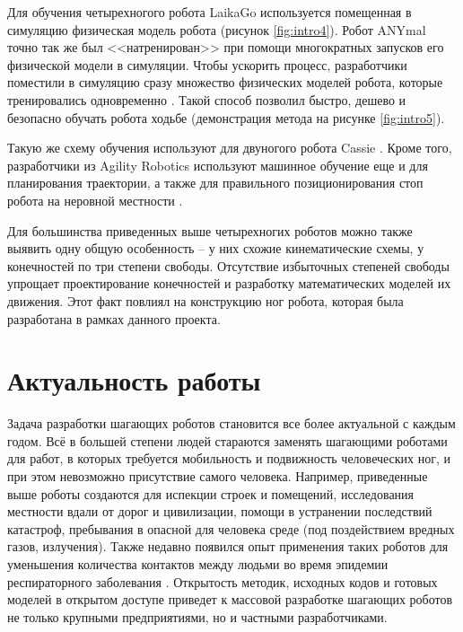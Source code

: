 Для обучения четырехногого робота LaikaGo используется помещенная в симуляцию физическая модель робота \cite{LaikaGo2019} (рисунок \ref{fig:intro4}). Робот ANYmal точно так же был <<натренирован>> при помощи многократных запусков его физической модели в симуляции. Чтобы ускорить процесс, разработчики поместили в симуляцию сразу множество физических моделей робота, которые тренировались одновременно \cite{RoboSysLab2019}. Такой способ позволил быстро, дешево и безопасно обучать робота ходьбе (демонстрация метода на рисунке \ref{fig:intro5}). 

Такую же схему обучения используют для двуногого робота Cassie \cite{AgilityRobo2018}. Кроме того, разработчики из Agility Robotics используют машинное обучение еще и для планирования траектории, а также для правильного позиционирования стоп робота на неровной местности \cite{Agility2020}.

Для большинства приведенных выше четырехногих роботов можно также выявить одну общую особенность -- у них схожие кинематические схемы, у конечностей по три степени свободы. Отсутствие избыточных степеней свободы упрощает проектирование конечностей и разработку математических моделей их движения. Этот факт повлиял на конструкцию ног робота, которая была разработана в рамках данного проекта.

\section*{Актуальность работы}

Задача разработки шагающих роботов становится все более актуальной с каждым годом. Всё в большей степени людей стараются заменять шагающими роботами для работ, в которых требуется мобильность и подвижность человеческих ног, и при этом невозможно присутствие самого человека. Например, приведенные выше роботы создаются для испекции строек и помещений, исследования местности вдали от дорог и цивилизации, помощи в устранении последствий катастроф, пребывания в опасной для человека среде (под поздействием вредных газов, излучения). Также недавно появился опыт применения таких роботов для уменьшения количества контактов между людьми во время эпидемии респираторного заболевания \cite{Bbc2020}. Открытость методик, исходных кодов и готовых моделей в открытом доступе приведет к массовой разработке шагающих роботов не только крупными предприятиями, но и частными разработчиками. 

